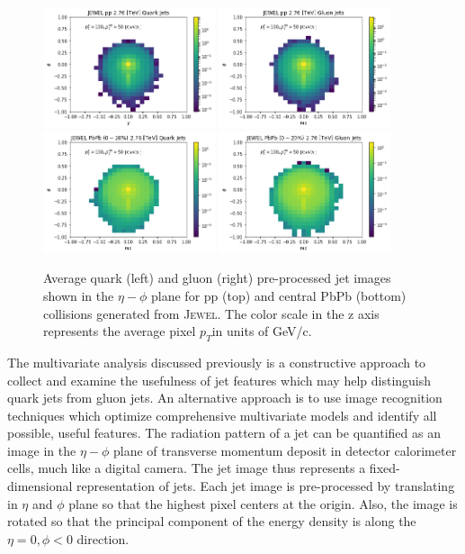 \documentclass[notoc]{JHEP3}
\newcommand{\pt}{$p_{T}$}
\newcommand{\jw}{\textsc{Jewel}}
\begin{document}
\begin{figure}[t]
\centering
\includegraphics[width=0.45\textwidth]{plots/jewel_pp_avgQuarkJet}
\includegraphics[width=0.45\textwidth]{plots/jewel_pp_avgGluonJet}
\includegraphics[width=0.45\textwidth]{plots/jewel_pbpb020_avgQuarkJet}
\includegraphics[width=0.45\textwidth]{plots/jewel_pbpb020_avgGluonJet}
\caption{Average quark (left) and gluon (right) pre-processed jet images shown in the $\eta-\phi$ plane for pp (top) and central PbPb (bottom) collisions generated from \jw. The color scale in the z axis represents the average pixel \pt in units of GeV/c. }
\label{fig:qgjetimages}
\end{figure}

The multivariate analysis discussed previously is a constructive approach to collect and examine the usefulness of jet features which may help distinguish quark jets from gluon jets. An alternative approach is to use image recognition techniques which optimize comprehensive multivariate models and identify all possible, useful features. The radiation pattern of a jet can be quantified as an image in the $\eta-\phi$ plane of transverse momentum deposit in detector calorimeter cells, much like a digital camera. The jet image thus represents a fixed-dimensional representation of jets. Each jet image is pre-processed \cite{deOliveira:2015xxd} by translating in $\eta$ and $\phi$ plane so that the highest pixel centers at the origin. Also, the image is rotated so that the principal component of the energy density is along the $\eta=0, \phi<0$ direction. 
 
\end{document}
